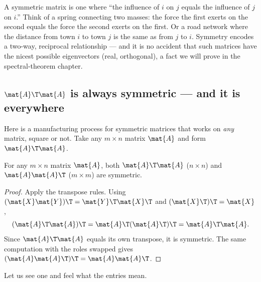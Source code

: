 \begin{intuitionbox}
A symmetric matrix is one where ``the influence of $i$ on $j$ equals the influence of $j$ on $i$.''
Think of a spring connecting two masses: the force the first exerts on the second equals the force
the second exerts on the first. Or a road network where the distance from town $i$ to town $j$ is
the same as from $j$ to $i$. Symmetry encodes a two-way, reciprocal relationship --- and it is no
accident that such matrices have the nicest possible eigenvectors (real, orthogonal), a fact we will
prove in the spectral-theorem chapter.
\end{intuitionbox}

\subsection{\texorpdfstring{$\mat{A}\T\mat{A}$}{ATA} is always symmetric --- and it is everywhere}

Here is a manufacturing process for symmetric matrices that works on \emph{any} matrix, square or
not. Take any $m\times n$ matrix $\mat{A}$ and form $\mat{A}\T\mat{A}$.

\begin{proposition}\label{ch10:prop-ATA}
For any $m\times n$ matrix $\mat{A}$, both $\mat{A}\T\mat{A}$ ($n\times n$) and $\mat{A}\mat{A}\T$
($m\times m$) are symmetric.
\end{proposition}

\begin{proof}
Apply the transpose rules. Using $(\mat{X}\mat{Y})\T=\mat{Y}\T\mat{X}\T$ and $(\mat{X}\T)\T=\mat{X}$,
\[
  (\mat{A}\T\mat{A})\T
  = \mat{A}\T(\mat{A}\T)\T
  = \mat{A}\T\mat{A}.
\]
Since $\mat{A}\T\mat{A}$ equals its own transpose, it is symmetric. The same computation with the
roles swapped gives $(\mat{A}\mat{A}\T)\T=\mat{A}\mat{A}\T$.
\end{proof}

Let us see one and feel what the entries mean.

